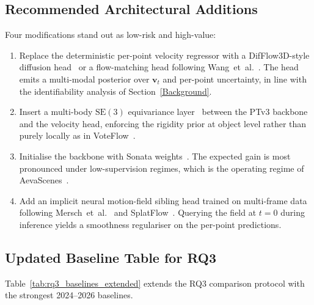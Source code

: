 \subsection{Recommended Architectural Additions}
\label{sec:new_algorithms:additions}

Four modifications stand out as low-risk and high-value:

\begin{enumerate}
    \item Replace the deterministic per-point velocity regressor with a DifFlow3D-style diffusion head~\cite{liu2024difflow3d} or a flow-matching head following Wang~et~al.~\cite{wang2025eqflowmatching}. The head emits a multi-modal posterior over $\mathbf{v}_t$ and per-point uncertainty, in line with the identifiability analysis of Section~\ref{Background}.
    \item Insert a multi-body $\mathrm{SE}(3)$ equivariance layer~\cite{liu2024multibodyse3} between the PTv3 backbone and the velocity head, enforcing the rigidity prior at object level rather than purely locally as in VoteFlow~\cite{voteflow2025}.
    \item Initialise the backbone with Sonata weights~\cite{wu2025sonata}. The expected gain is most pronounced under low-supervision regimes, which is the operating regime of AevaScenes~\cite{aeva2025aevascenes}.
    \item Add an implicit neural motion-field sibling head trained on multi-frame data following Mersch~et~al.~\cite{mersch2024fourdinr} and SplatFlow~\cite{sun2025splatflow}. Querying the field at $t = 0$ during inference yields a smoothness regulariser on the per-point predictions.
\end{enumerate}

\subsection{Updated Baseline Table for RQ3}
\label{sec:new_algorithms:baselines}

Table~\ref{tab:rq3_baselines_extended} extends the RQ3 comparison protocol with the strongest 2024--2026 baselines.

